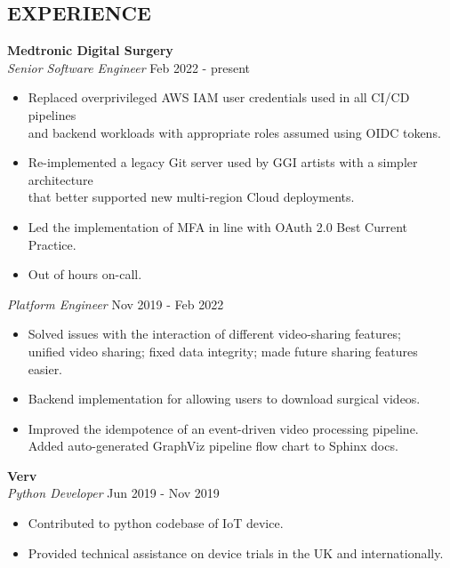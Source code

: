 \documentclass[line,margin]{res}
\begin{document}
\begin{resume}
\section{EXPERIENCE} \textbf{Medtronic Digital Surgery} \\
                {\sl Senior Software Engineer} \hfill   Feb 2022 - present \\
                 \begin{itemize}  \itemsep  -0pt %
                   \item Replaced overprivileged AWS IAM user credentials used in all CI/CD pipelines \\
                         and backend workloads with appropriate roles assumed using OIDC tokens.
                   \item Re-implemented a legacy Git server used by GGI artists with a simpler architecture \\
                         that better supported new multi-region Cloud deployments.
                   \item Led the implementation of MFA in line with OAuth 2.0 Best Current Practice.
                   \item Out of hours on-call.
                 \end{itemize}
                {\sl Platform Engineer} \hfill          Nov 2019 - Feb 2022 \\
                  \begin{itemize}  \itemsep -0pt %
                  \item Solved issues with the interaction of different video-sharing features; \\
                        unified video sharing; fixed data integrity; made future sharing features easier.
                  \item Backend implementation for allowing users to download surgical videos.
                  \item Improved the idempotence of an event-driven video processing pipeline. \\
                        Added auto-generated GraphViz pipeline flow chart to Sphinx docs.
                  \end{itemize}

                \textbf{Verv} \\
                {\sl Python Developer} \hfill        Jun 2019 - Nov 2019 \\
                  \begin{itemize} \itemsep -0pt %
                  \item Contributed to python codebase of IoT device.\
                  \item Provided technical assistance on device trials in the UK and internationally.
                  \end{itemize}


\end{resume}
\end{document}
